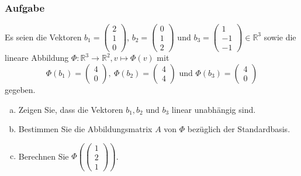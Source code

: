 \documentclass[a4paper,11pt]{scrartcl}
\newcounter{auf}
\newcommand{\Aufgabe}%
        {\addtocounter{auf}{1} \subsubsection*{\rmfamily  Aufgabe \theauf \hspace{1em}} }
\newcommand{\RR}{\mathbb{R}}
\begin{document}
\newpage
\Aufgabe

Es seien die Vektoren $b_1=\begin{pmatrix} 2\\1\\0\end{pmatrix}$, $b_2=\begin{pmatrix} 0\\1\\2\end{pmatrix}$ und $b_3=\begin{pmatrix} 1\\-1\\-1\end{pmatrix} \in \RR^3$ sowie die lineare Abbildung 
$
\Phi: \RR^3 \to \RR^2, v \mapsto \Phi(v)
$
mit 
$$
\Phi(b_1)=\begin{pmatrix} 4\\0\end{pmatrix}, \ \Phi(b_2)=\begin{pmatrix} 4\\4\end{pmatrix} \text{ und } \Phi(b_3)=\begin{pmatrix} 4\\0\end{pmatrix}
$$
gegeben.

\begin{enumerate}[a)]

\item Zeigen Sie, dass die Vektoren $b_1,b_2$ und $b_3$ linear unabhängig sind.
\item Bestimmen Sie die Abbildungsmatrix $A$ von $\Phi$ bezüglich der Standardbasis.
\item Berechnen Sie $\Phi(\begin{pmatrix} 1\\2\\1 \end{pmatrix})$.

\end{enumerate}
%
%
\end{document}
